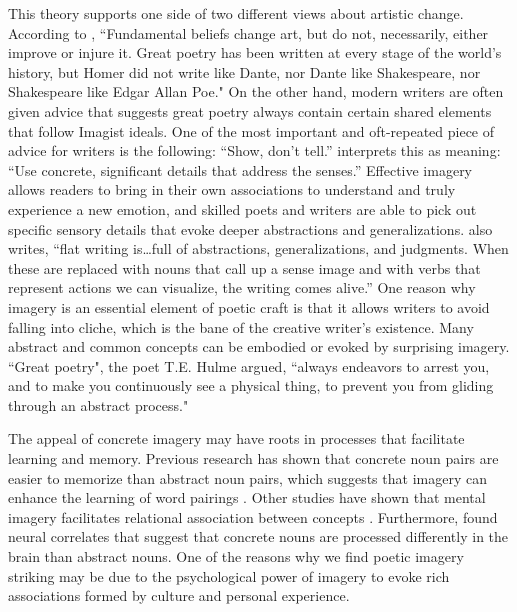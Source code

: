 \documentclass{book}
\begin{document}
This theory supports one side of two different views about artistic change. According to \cite{lowell1920tendencies}, ``Fundamental beliefs change art, but do not, necessarily, either improve or injure it. Great poetry has been written at every stage of the world's history, but Homer did not write like Dante, nor Dante like Shakespeare, nor Shakespeare like Edgar Allan Poe." On the other hand, modern writers are often given advice that suggests great poetry always contain certain shared elements that follow Imagist ideals. One of the most important and oft-repeated piece of advice for writers is the following: ``Show, don't tell.'' \cite{Burroway} interprets this as meaning: ``Use concrete, significant details that address the senses.'' Effective imagery allows readers to bring in their own associations to understand and truly experience a new emotion, and skilled poets and writers are able to pick out specific sensory details that evoke deeper abstractions and generalizations.  \cite{Burroway} also writes, ``flat writing is\dots full of abstractions, generalizations, and judgments. When these are replaced with nouns that call up a sense image and with verbs that represent actions we can visualize, the writing comes alive.'' One reason why imagery is an essential element of poetic craft is that it allows writers to avoid falling into cliche, which is the bane of the creative writer's existence. Many abstract and common concepts can be embodied or evoked by surprising imagery. ``Great poetry", the poet T.E. Hulme argued, ``always endeavors to arrest you, and to make you continuously see a physical thing, to prevent you from gliding through an abstract process."

The appeal of concrete imagery may have roots in processes that facilitate learning and memory. Previous research has shown that concrete noun pairs are easier to memorize than abstract noun pairs, which suggests that imagery can enhance the learning of word pairings \citep{pairing}. Other studies have shown that mental imagery facilitates relational association between concepts \citep{imagery}. Furthermore, \cite{neuro} found neural correlates that suggest that concrete nouns are processed differently in the brain than abstract nouns. One of the reasons why we find poetic imagery striking may be due to the psychological power of imagery to evoke rich associations formed by culture and personal experience. 
\end{document}
